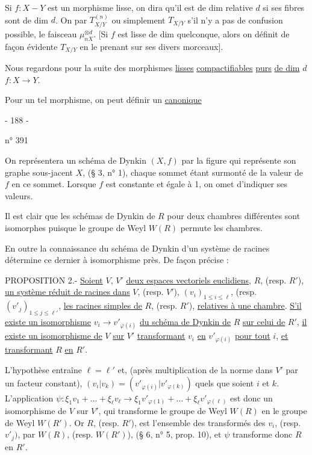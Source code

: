 Si $f:X\mathbin{-}Y$ est un morphisme lisse, on dira qu'il est  de dim relative $d$ si ses fibres sont  de dim $d$. On  par $T_{X/Y}^{(n)}$ ou simplement $T_{X/Y}$ s'il n'y a pas de confusion possible, le faisceau $\mu_{nX}^{\otimes d}$. [Si $f$ est lisse de dim  quelconque, alors on définit de façon évidente $T_{X/Y}$ en le prenant sur ses divers morceaux].

Nous regardons pour la suite des morphismes \uline{lisses} \uline{compactifiables} \uline{purs} \uline{de dim} $d$\quad $f:X\longrightarrow Y$.

Pour un tel morphisme, on peut définir un \uline{  canonique}
\begin{center}- 188 -\end{center}
\hfill n° 391

On représentera un schéma de Dynkin $(X,f)$ par la figure qui représente son graphe sous-jacent $X$, (§ 3, n° 1), chaque sommet étant surmonté de la valeur de $f$ en ce sommet. Lorsque $f$ est constante et égale à 1, on omet d'indiquer ses valeurs.

Il est clair que les schémas de Dynkin de $R$ pour deux chambres différentes sont isomorphes puisque le groupe de Weyl $W(R)$ permute les chambres.

En outre la connaissance du schéma de Dynkin d'un système de racines détermine ce dernier à isomorphisme près. De façon précise :

PROPOSITION 2.- \uline{Soient} $V$, $V'$ \uline{deux espaces vectoriels euclidiens}, $R$, (resp. $R'$), \uline{un système réduit de racines dans} $V$, (resp. $V'$), $(v_i)_{1\leq i\leq\ell}$, (resp. $(v'_j)_{1\leq j\leq\ell'}$, \uline{les racines simples de} $R$, (resp. $R'$), \uline{relatives à une chambre}. \uline{S'il existe un isomorphisme} $v_i\longrightarrow v'_{\varphi(i)}$ \uline{du schéma de Dynkin de} $R$ \uline{sur celui de} $R'$, \uline{il existe un isomorphisme de} $V$ \uline{sur} $V'$ \uline{transformant} $v_i$ \uline{en} $v'_{\varphi(i)}$ \uline{pour tout} $i$, \uline{et transformant} $R$ \uline{en} $R'$.

L'hypothèse entraîne $\ell=\ell'$ et, (après multiplication de la norme dans $V'$ par un facteur constant), $(v_i|v_k)=(v'_{\varphi(i)}|v'_{\varphi(k)})$ quels que soient $i$ et $k$. L'application $\psi:\xi_1v_1+\ldots+\xi_\ell v_\ell\longrightarrow\xi_1v'_{\varphi(1)}+\ldots+\xi_\ell v'_{\varphi(\ell)}$ est donc un isomorphisme de $V$ sur $V'$, qui transforme le groupe de Weyl $W(R)$ en le groupe de Weyl $W(R')$. Or $R$, (resp. $R'$), est l'ensemble des transformés des $v_i$, (resp. $v'_j)$, par $W(R)$, (resp. $W(R')$), (§ 6, n° 5, prop. 10), et $\psi$ transforme donc $R$ en $R'$.

